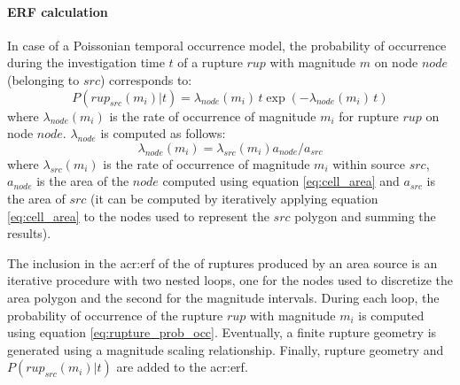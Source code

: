 \paragraph{ERF calculation}
\label{par:erf_calc_area_src}
In case of a Poissonian temporal occurrence model, the probability of 
occurrence during the investigation time $t$ of a rupture $rup$ with 
magnitude $m$ on node $node$ (belonging to $src$) corresponds to:
\begin{equation}
P(rup_{src}(m_i)|t)=\lambda_{node}(m_i)\,t\exp(-\lambda_{node}(m_i)\,t)
\label{eq:rupture_prob_occ}
\end{equation}
where $\lambda_{node}(m_i)$ is the rate of occurrence of magnitude $m_i$ 
for rupture $rup$ on node $node$. $\lambda_{node}$ is computed as follows:
\[ 
\lambda_{node}(m_i) = \lambda_{src}(m_i)a_{node}/a_{src}
\]
%
where $\lambda_{src}(m_i)$ is the rate of occurrence of magnitude $m_i$
within source $src$, $a_{node}$ is the area of the $node$ computed using
equation \ref{eq:cell_area} and $a_{src}$ is the area of $src$ (it can be
computed by iteratively applying equation \ref{eq:cell_area} to the 
nodes used to represent the $src$ polygon and summing the results). 

The inclusion in the \gls{acr:erf} of the of ruptures produced by 
an area source is an iterative procedure with two nested loops, one 
for the nodes used to discretize the area polygon and the second for 
the magnitude intervals. 
%
During each loop, the probability of occurrence of the rupture $rup$
with magnitude $m_i$ is computed using equation \ref{eq:rupture_prob_occ}.
Eventually, a finite rupture geometry is generated using a magnitude 
scaling relationship. Finally, rupture geometry and $P(rup_{src}(m_i)|t)$
are added to the \gls{acr:erf}.
%
